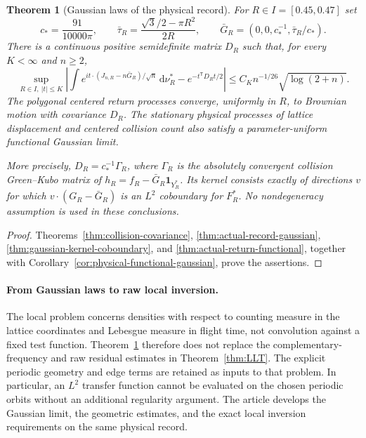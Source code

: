 \documentclass[11pt,reqno]{amsart}
\numberwithin{equation}{section}
\newtheorem{maintheorem}{Theorem}
\theoremstyle{definition}\newtheorem{definition}[theorem]{Definition}
\theoremstyle{remark}\newtheorem{remark}[theorem]{Remark}
\newcommand{\dd}{\,\mathrm d}\newcommand{\one}{\mathbf1}
\begin{document}
\begin{maintheorem}[Gaussian laws of the physical record]
\label{thm:intro-gaussian}
For $R\in I=[0.45,0.47]$ set
\[
 c_* = \frac{91}{10000\pi},\qquad
 \bar\tau_R=\frac{\sqrt3/2-\pi R^2}{2R},\qquad
 \bar G_R=(0,0,c_*^{-1},\bar\tau_R/c_*).
\]
There is a continuous positive semidefinite matrix $D_R$ such that,
for every $K<\infty$ and $n\ge2$,
\[
 \sup_{R\in I,\ |t|\le K}
 \left|\int e^{it\cdot(J_{n,R}-n\bar G_R)/\sqrt n}\dd\nu_R^*
              -e^{-t^{\mathsf T}D_Rt/2}\right|
 \le C_Kn^{-1/26}\sqrt{\log(2+n)}.
\]
The polygonal centered return processes converge, uniformly in $R$,
to Brownian motion with covariance $D_R$. The stationary physical
processes of lattice displacement and centered collision count also
satisfy a parameter-uniform functional Gaussian limit.

More precisely, $D_R=c_*^{-1}\Gamma_R$, where $\Gamma_R$ is the
absolutely convergent collision Green--Kubo matrix of
$h_R=f_R-\bar G_R\one_{Y_R^*}$. Its kernel consists exactly of directions
$v$ for which $v\cdot(G_R-\bar G_R)$ is an $L^2$ coboundary for
$F_R^*$. No nondegeneracy assumption is used in these conclusions.
\end{maintheorem}
\begin{proof}
Theorems~\ref{thm:collision-covariance},
\ref{thm:actual-record-gaussian}, \ref{thm:gaussian-kernel-coboundary},
and \ref{thm:actual-return-functional}, together with
Corollary~\ref{cor:physical-functional-gaussian}, prove the assertions.
\end{proof}

\paragraph{From Gaussian laws to raw local inversion.}
The local problem concerns densities with respect to counting measure
in the lattice coordinates and Lebesgue measure in flight time, not
convolution against a fixed test function. Theorem~\ref{thm:intro-gaussian}
therefore does not replace the complementary-frequency and raw residual
estimates in Theorem~\ref{thm:LLT}. The explicit periodic geometry
and edge terms are retained as inputs to that problem. In particular,
an $L^2$ transfer function cannot be evaluated on the chosen periodic
orbits without an additional regularity argument. The article develops
the Gaussian limit, the geometric estimates, and the exact local
inversion requirements on the same physical record.


















\end{document}
